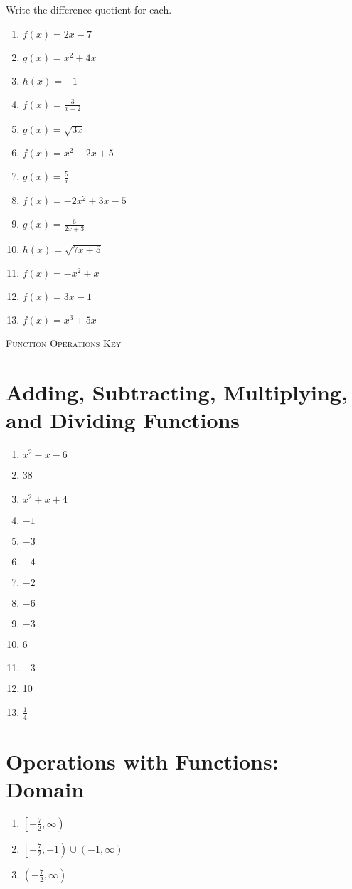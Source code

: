 Write the difference quotient for each.
\begin{multicols}{2}
\begin{enumerate}
	\item $f(x) = 2x - 7$
	\item $g(x) = x^2 + 4x$
	\item $h(x) = -1$
	\item $f(x) = \frac{3}{x+2}$
	\item $g(x) = \sqrt{3x}$
	\item $f(x) = x^2 - 2x + 5$
	\item $g(x) = \frac{5}{x}$
	\item $f(x) = -2x^2 + 3x - 5$
	\item $g(x) = \frac{6}{2x+3}$
	\item $h(x) = \sqrt{7x+5}$
	\item $f(x) = -x^2 + x$
	\item $f(x) = 3x - 1$
	\item $f(x) = x^3 + 5x$
\end{enumerate}
\end{multicols}

\newpage


\textsc{Function Operations Key}

\section*{Adding, Subtracting, Multiplying, and Dividing Functions}

\begin{multicols}{2}
\begin{enumerate}
    \item $x^2-x-6$
    \item 38
    \item $x^2+x+4$
    \item $-1$
     \item $-3$
     \item $-4$
     \item $-2$
     \item $-6$
     \item $-3$
    \item 6
    \item $-3$
    \item 10
    \item $\frac{1}{4}$
\end{enumerate}
\end{multicols}

\section*{Operations with Functions: Domain}
\begin{enumerate}
	\item $\left[-\frac{7}{2}, \infty\right)$
    \item $\left[-\frac{7}{2}, -1\right) \cup (-1, \infty)$
    \item $\left(-\frac{7}{2}, \infty\right)$
\end{enumerate}

